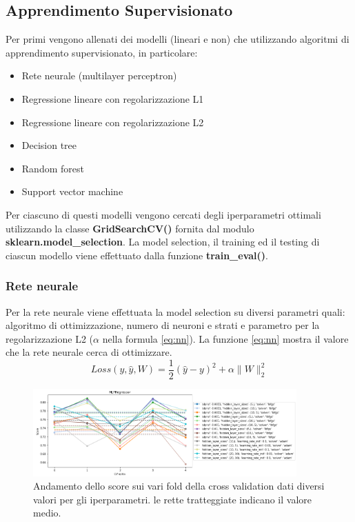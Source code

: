 \documentclass{article}
\begin{document}
\subsection{Apprendimento Supervisionato}
Per primi vengono allenati dei modelli (lineari e non) che utilizzando
algoritmi di apprendimento supervisionato, in particolare:
\begin{itemize}
	\itemsep0em
	\item Rete neurale (multilayer perceptron)
	\item Regressione lineare con regolarizzazione L1
	\item Regressione lineare con regolarizzazione L2
	\item Decision tree
	\item Random forest
	\item Support vector machine
\end{itemize}
Per ciascuno di questi modelli vengono cercati degli iperparametri ottimali
utilizzando la classe \textbf{GridSearchCV()} fornita dal modulo
\textbf{sklearn.model\_selection}.
La model selection, il training ed il testing di ciascun modello viene
effettuato dalla funzione \textbf{train\_eval()}.

\subsubsection{Rete neurale}
Per la rete neurale viene effettuata la model selection su diversi parametri
quali: algoritmo di ottimizzazione, numero di neuroni e strati e parametro per
la regolarizzazione L2 ($\alpha$ nella formula \ref{eq:nn}). La funzione
\ref{eq:nn} mostra il valore che la rete neurale cerca di ottimizzare.
\begin{equation}
	Loss(y, \hat{y}, W)=\frac{1}{2}(\hat{y}-y)^2 + \alpha\|W\|^2_2
	\label{eq:nn}
\end{equation}
\begin{figure}[ht]
	\centering
	\includegraphics[width=0.9\textwidth]{nncv.png}
	\caption{Andamento dello score sui vari fold della cross validation dati
	diversi valori per gli iperparametri. le rette tratteggiate indicano il
	valore medio.}
\end{figure}
\end{document}
